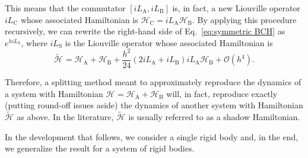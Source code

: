 \documentclass[
journal=jctcce,
layout=twocolumn
]{achemso}
\newcommand{\Ham}[1]{{\mathcal H}_\text{#1}}    %
\newcommand{\Liu}[1]{i\!L_\text{#1}}            %
\newcommand{\timestep}{h}
\newcommand{\modified}[1]{\widetilde{#1}}
\begin{document}
This means that the commutator $[\Liu A,\Liu B]$ is, in fact, a new Liouville operator $\Liu C$ whose associated Hamiltonian is $\Ham C = {\Liu A}{\Ham B}$.
By applying this procedure recursively, we can rewrite the right-hand side of Eq.~\eqref{eq:symmetric BCH} as $e^{\timestep \Liu S}$, where $\Liu S$ is the Liouville operator whose associated Hamiltonian is
\begin{equation*}
\label{eq:general shadow hamiltonian}
\modified{\Ham{}} = \Ham A + \Ham B + \frac{h^2}{24} (2 \Liu A + \Liu B){\Liu A}{\Ham B} + \mathcal{O}(h^4).
\end{equation*}

Therefore, a splitting method meant to approximately reproduce the dynamics of a system with Hamiltonian $\Ham{} = \Ham A + \Ham B$ will, in fact, reproduce exactly (putting round-off issues aside) the dynamics of another system with Hamiltonian $\modified{\Ham{}}$ as above.
In the literature, $\modified{\Ham{}}$ is usually referred to as a shadow Hamiltonian.

In the development that follows, we consider a single rigid body and, in the end, we generalize the result for a system of rigid bodies.
\end{document}
